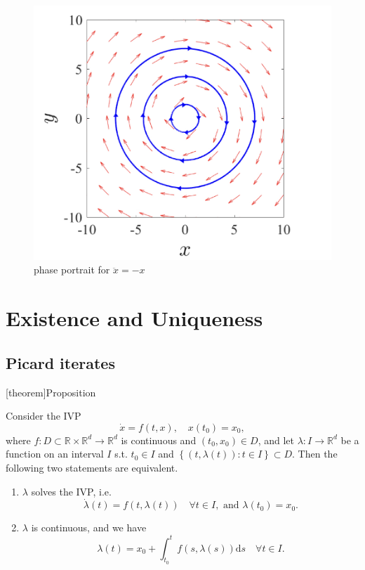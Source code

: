 \documentclass[12pt]{report}
\theoremstyle{definition}
\begin{document}
\begin{figure}
  	\includegraphics[scale=0.4]{./images/phase_portrait2.jpeg}
  	\centering
    \caption{phase portrait for $\ddot{x}=-x$}
\end{figure}


\chapter{Existence and Uniqueness}

\section{Picard iterates}

[theorem]{Proposition}
\begin{reformulation as integral equation}
    Consider the IVP
    \[
        \dot{x}=f(t,x), \quad x(t_0)=x_0,
    \]
    where $f:D\subset\mathbb{R}\times\mathbb{R}^{d}\rightarrow\mathbb{R}^{d}$
    is continuous and $(t_0, x_0)\in D$, and let 
    $\lambda:I\rightarrow\mathbb{R}^{d}$ be a function on an interval $I$
    s.t. $t_0\in I$ and $\left\{(t,\lambda(t)):t\in I\right\}\subset D$.
    Then the following two statements are equivalent.
    \begin{enumerate}[label = (\roman*)]
        \item $\lambda$ solves the IVP, i.e.\
            \[
                \dot{\lambda}(t)=f(t, \lambda(t)) \quad\forall t\in I,
                \text{ and } \lambda(t_0)=x_0.
            \]
        \item $\lambda$ is continuous, and we have
            \[
                \lambda(t)=x_0+\int_{t_0}^{t}f(s,\lambda(s))\mathrm{d}s
                \quad\forall t\in I.
            \]
    \end{enumerate} 
\end{reformulation as integral equation}
\end{document}
